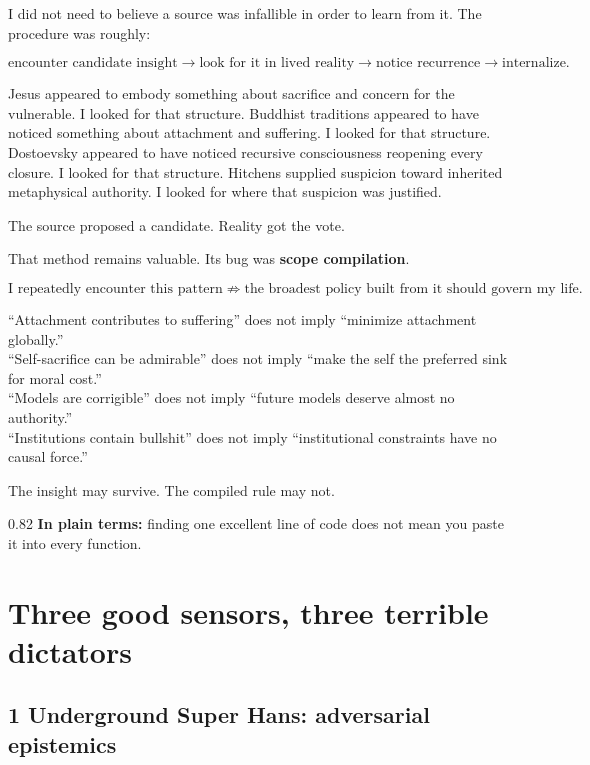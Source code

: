 \documentclass[10pt,letterpaper]{article}
\newenvironment{paperbody}
  {\begingroup\justifying}
  {\par\endgroup}
\newenvironment{plainbox}
  {\Needspace{3.5\baselineskip}\par\vspace{0.24em}\begin{center}\begingroup
   \begin{lrbox}{\plainboxsave}\begin{varwidth}{0.82\linewidth}
   \small\rmfamily\upshape\RaggedRight}
  {\end{varwidth}\end{lrbox}\fbox{\usebox{\plainboxsave}}
   \endgroup\end{center}\vspace{0.24em}}
\let\oldsection\section
\renewcommand{\section}{\Needspace{6\baselineskip}\oldsection}
\let\oldsubsection\subsection
\renewcommand{\subsection}{\Needspace{5\baselineskip}\oldsubsection}
\begin{document}
\begin{paperbody}
I did not need to believe a source was infallible in order to learn from
it. The procedure was roughly:

\[
\text{encounter candidate insight}
\to
\text{look for it in lived reality}
\to
\text{notice recurrence}
\to
\text{internalize}.
\]

Jesus appeared to embody something about sacrifice and concern for the
vulnerable. I looked for that structure. Buddhist traditions appeared to
have noticed something about attachment and suffering. I looked for that
structure. Dostoevsky appeared to have noticed recursive consciousness
reopening every closure. I looked for that structure. Hitchens supplied
suspicion toward inherited metaphysical authority. I looked for where
that suspicion was justified.

The source proposed a candidate. Reality got the vote.

That method remains valuable. Its bug was \textbf{scope compilation}.

\[
\text{I repeatedly encounter this pattern}
\not\Rightarrow
\text{the broadest policy built from it should govern my life}.
\]

``Attachment contributes to suffering'' does not imply ``minimize
attachment globally.''\\
``Self-sacrifice can be admirable'' does not imply ``make the self the
preferred sink for moral cost.''\\
``Models are corrigible'' does not imply ``future models deserve almost
no authority.''\\
``Institutions contain bullshit'' does not imply ``institutional
constraints have no causal force.''

The insight may survive. The compiled rule may not.

\begin{plainbox}
\textbf{In plain terms:} finding one excellent line of code does not
mean you paste it into every function.
\end{plainbox}

\section{Three good sensors, three terrible
dictators}\label{three-good-sensors-three-terrible-dictators}

\subsection{1 Underground Super Hans: adversarial
epistemics}\label{underground-super-hans-adversarial-epistemics}


\end{paperbody}
\end{document}
